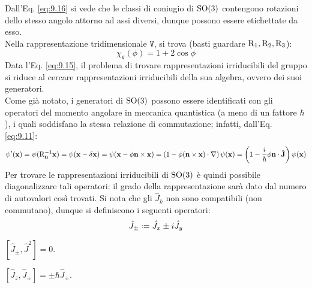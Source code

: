 Dall'Eq. \ref{eq:9.16} si vede che le classi di coniugio di $ \mathrm{SO}(3) $ contengono rotazioni dello stesso angolo attorno ad assi diversi, dunque possono essere etichettate da esso.\\
Nella rappresentazione tridimensionale $ \mathtt{V} $, si trova (basti guardare $ \mathrm{R}_1, \mathrm{R}_2, \mathrm{R}_3 $):
\begin{equation}
	\chi_{\mathtt{V}}(\phi) = 1 + 2 \cos \phi
	\label{eq:9.17}
\end{equation}
Data l'Eq. \ref{eq:9.15}, il problema di trovare rappresentazioni irriducibili del gruppo si riduce al cercare rappresentazioni irriducibili della sua algebra, ovvero dei suoi generatori.\\
Come già notato, i generatori di $ \mathrm{SO}(3) $ possono essere identificati con gli operatori del momento angolare in meccanica quantistica (a meno di un fattore $ \hbar $), i quali soddisfano la stessa relazione di commutazione; infatti, dall'Eq. \ref{eq:9.11}:
\begin{equation*}
	\psi'(\mathbf{x}) = \psi(\mathrm{R}_{\mathbf{n}}^{-1} \mathbf{x}) = \psi(\mathbf{x} - \delta\mathbf{x}) = \psi(\mathbf{x} - \phi \mathbf{n} \times \mathbf{x}) = \left( 1 - \phi (\mathbf{n} \times \mathbf{x}) \cdot \nabla \right) \psi(\mathbf{x}) = \left( 1 - \frac{i}{\hbar} \phi \mathbf{n} \cdot \hat{\mathbf{J}} \right) \psi(\mathbf{x})
\end{equation*}
Per trovare le rappresentazioni irriducibili di $ \mathrm{SO}(3) $ è quindi possibile diagonalizzare tali operatori: il grado della rappresentazione sarà dato dal numero di autovalori così trovati.
Si nota che gli $ \hat{J}_k $ non sono compatibili (non commutano), dunque si definiscono i seguenti operatori:
\begin{equation}
	\hat{J}_{\pm} \defeq \hat{J}_x \pm i \hat{J}_y
	\label{eq:9.18}
\end{equation}

\begin{proposition}
	$ [\hat{J}_{\pm}, \hat{J}^2] = 0 $.
\end{proposition}
\begin{proposition}
	$ [\hat{J}_z, \hat{J}_{\pm}] = \pm \hbar \hat{J}_{\pm} $.
\end{proposition}

